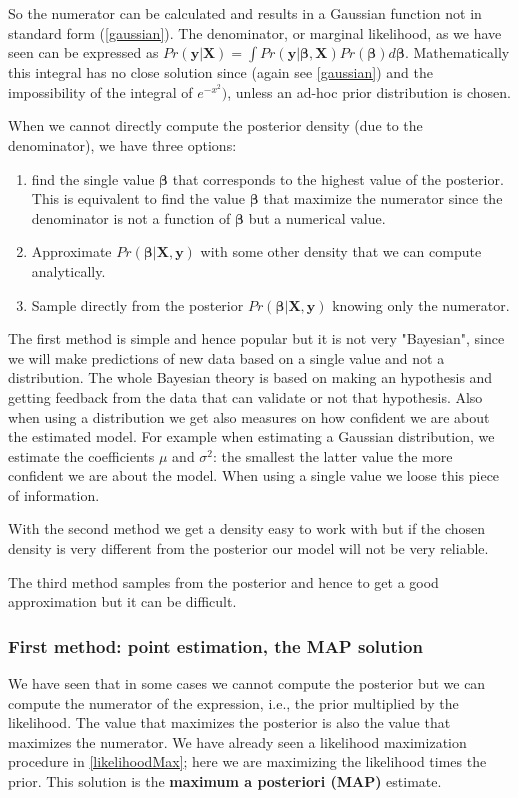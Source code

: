 \documentclass[12pt, letterpaper]{article}
\theoremstyle{definition}
\newcommand{\X}{\mathrm{\mathbf{X}}}
\newcommand{\y}{\mathbf{y}}
\newcommand{\be}{\mathbf{\beta}}
\begin{document}
So the numerator can be calculated and results in a Gaussian function not in standard form (\autoref{gaussian}). The denominator, or marginal likelihood, as we have seen can be expressed as $Pr(\y|\X) = \int Pr\left(\y|\be,\X\right) Pr(\be) d\be$. Mathematically this integral has no close solution since (again see \autoref{gaussian}) and the impossibility of the integral of $e^{-x^2})$, unless an ad-hoc prior distribution is chosen.

When we cannot directly compute the posterior density (due to the denominator), we have three options:
\begin{enumerate}
\item find the single value $\be$ that corresponds to the highest value of the posterior. This is equivalent to find the value $\be$ that maximize the numerator since the denominator is not a function of $\be$ but a numerical value.
\item Approximate $Pr(\be|\X, \y)$ with some other density that we can compute analytically.
\item Sample directly from the posterior $Pr(\be|\X,\y)$ knowing only the numerator.
\end{enumerate}

The first method is simple and hence popular but it is not very "Bayesian", since we will make predictions of new data based on a single value and not a distribution. The whole Bayesian theory is based on making an hypothesis and getting feedback from the data that can validate or not that hypothesis. Also when using a distribution we get also measures on how confident we are about the estimated model. For example when estimating a Gaussian distribution, we estimate the coefficients $\mu$ and $\sigma^2$: the smallest the latter value the more confident we are about the model. When using a single value we loose this piece of information.

With the second method we get a density easy to work with but if the chosen density is very different from the posterior our model will not be very reliable.

The third method samples from the posterior and hence to get a good approximation but it can be difficult.

\subsubsection{First method: point estimation, the MAP solution}
We have seen that in some cases we cannot compute the posterior but we can compute the numerator of the expression, i.e., the prior multiplied by the likelihood. The value that maximizes the posterior is also the value that maximizes the numerator. We have already seen a likelihood maximization procedure in \autoref{likelihoodMax}; here we are maximizing the likelihood times the prior. This solution is the \textbf{maximum a posteriori (MAP)} estimate.
\end{document}
